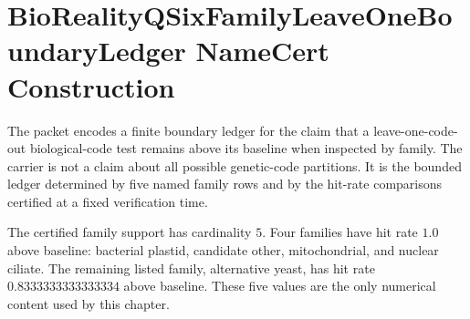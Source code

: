 \chapter{BioRealityQSixFamilyLeaveOneBoundaryLedger NameCert Construction}
\label{ch:concrete-instances-bioreality-q-six-family-leave-one-boundary-ledger-namecert}

The \BioRealityQSixFamilyLeaveOneBoundaryLedgerUp packet encodes a finite boundary ledger for the claim that a leave-one-code-out biological-code test remains above its baseline when inspected by family.  The carrier is not a claim about all possible genetic-code partitions.  It is the bounded ledger determined by five named family rows and by the hit-rate comparisons certified at a fixed verification time.

The certified family support has cardinality $5$.  Four families have hit rate $1.0$ above baseline: bacterial plastid, candidate other, mitochondrial, and nuclear ciliate.  The remaining listed family, alternative yeast, has hit rate $0.8333333333333334$ above baseline.  These five values are the only numerical content used by this chapter.



